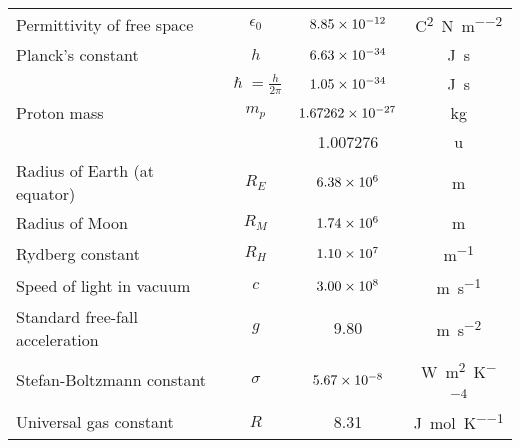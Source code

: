 \begin{longtable}{l c c c}
  Permittivity of free space & $\epsilon_0$ & $8.85\times 10^{-12}$ & \si{\coulomb\squared\per\newton\per\meter\squared} \\
  Planck's constant & $h$ & $6.63\times 10^{-34}$ & \si{\joule\second} \\
           & $\hslash=\frac{h}{2\pi}$ & $1.05\times 10^{-34}$ & \si{\joule\second} \\
  Proton mass & $m_p$ & $1.67262\times 10^{-27}$ & \si{\kilo\gram} \\
           && 1.007276 & \si{\atomicmassunit} \\
  Radius of Earth (at equator) & $R_E$ & $6.38\times 10^{6}$ & \si{\meter} \\
  Radius of Moon & $R_M$ & $1.74\times 10^{6}$ & \si{\meter} \\
  Rydberg constant & $R_H$ & $1.10\times 10^{7}$ & \si{\meter^{-1}} \\
  Speed of light in vacuum & $c$ & $3.00\times 10^{8}$ & \si{\meter\per\second} \\
  Standard free-fall acceleration & $g$ & 9.80 & \si{\meter\per\second\squared} \\
  Stefan-Boltzmann constant & $\sigma$ & $5.67\times 10^{-8}$ & \si{\watt\per\meter\squared\per\kelvin^4} \\
  Universal gas constant & $R$ & 8.31 & \si{\joule\per\mole\per\kelvin} \\
  \bottomrule
\end{longtable}



